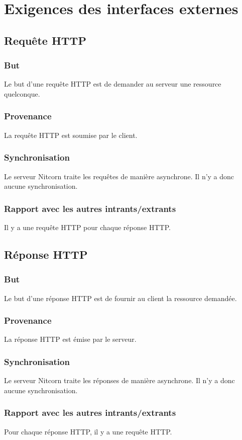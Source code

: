 \documentclass{scrreprt}
\begin{document}
\section{Exigences des interfaces externes}
\subsection{Requête HTTP}
\subsubsection{But} Le but d'une requête HTTP est de demander au serveur une ressource quelconque.
\subsubsection{Provenance} La requête HTTP est soumise par le client.
\subsubsection{Synchronisation} Le serveur Nitcorn traite les requêtes de manière asynchrone. Il n'y a donc aucune synchronisation.
\subsubsection{Rapport avec les autres intrants/extrants} Il y a une requête HTTP pour chaque réponse HTTP.
\subsection{Réponse HTTP}
\subsubsection{But} Le but d'une réponse HTTP est de fournir au client la ressource demandée.
\subsubsection{Provenance} La réponse HTTP est émise par le serveur.
\subsubsection{Synchronisation} Le serveur Nitcorn traite les réponses de manière asynchrone. Il n'y a donc aucune synchronisation.
\subsubsection{Rapport avec les autres intrants/extrants} Pour chaque réponse HTTP, il y a une requête HTTP.
\end{document}
